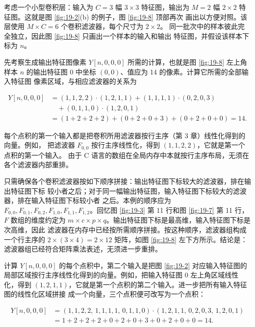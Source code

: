 考虑一个小型卷积层：输入为 $C=3$ 幅 $3\times3$ 特征图，输出为 $M=2$ 幅
$2\times2$ 特征图。这就是图 \ref{fig:19-2}(b) 的例子，图 \ref{fig:19-8} 顶部再次
画出以方便对照。该层使用 $M\times C=6$ 个卷积滤波器，每个尺寸为 $2\times2$。
同一批次中的样本彼此完全独立，因此图 \ref{fig:19-8} 只画出一个样本的输入和输出
特征图，并假设该样本下标为 $n$。

先考察生成输出特征图像素 $Y[n,0,0,0]$ 所需的计算，也就是图 \ref{fig:19-8} 左上角
样本 $n$ 的输出特征图 0 中坐标 $(0,0)$、值应为 14 的像素。计算它所需的全部输入特征图
像素区域，与相应滤波器的关系为

\begin{equation}
\begin{aligned}
Y[n,0,0,0]
 &= (1,1,2,2)\mathbin{\cdot}(1,2,1,1)
  +(1,1,1,1)\mathbin{\cdot}(0,2,0,3)\\
 &\quad +(0,1,1,0)\mathbin{\cdot}(1,2,0,1)\\
 &= (1+2+2+2)+(0+2+0+3)+(0+2+0+0)=14.
\end{aligned}
\label{eq:ch19-three-inner-products}
\end{equation}

每个点积的第一个输入都是把卷积所用滤波器按行主序（第 3 章）线性化得到的向量。例如，
把滤波器 $F_{0,0}$ 按行主序线性化，得到 $(1,1,2,2)$，它就是第一个点积的第一个输入。
由于 C 语言的数组在全局内存中本就按行主序布局，无须在各个滤波器内部重排。

只需确保各个卷积滤波器按如下顺序拼接：输出特征图下标较大的滤波器，排在输出特征图下标
较小者之后；对于同一幅输出特征图，输入特征图下标较大的滤波器，排在输入特征图下标较小者
之后。本例的顺序应为
$F_{0,0},F_{0,1},F_{0,2},F_{1,0},F_{1,1},F_{1,2}$。回忆图
\ref{fig:19-3} 第 11 行和图 \ref{fig:19-7} 第 11 行，$F$ 数组的维度约定为
$m\times c\times p\times q$。输出特征图下标是最高维，输入特征图下标是次高维，因此
滤波器在内存中已经按所需顺序拼接。按这种顺序，滤波器组构成一个行主序的
$2\times(3\times4)=2\times12$ 矩阵，如图 \ref{fig:19-8} 左下方所示。结论是：
滤波器组已经符合矩阵乘法表述，无须进一步重排。

计算 $Y[n,0,0,0]$ 的每个点积中，第二个输入是把图 \ref{fig:19-2} 对应输入特征图的
局部区域按行主序线性化得到的向量。例如，把输入特征图 0 左上角区域线性化，得到
$(1,2,1,1)$，它就是第一个点积的第二个输入。进一步把所有输入特征图的线性化区域拼接
成一个向量，三个点积便可改写为一个点积：

\begin{equation}
\begin{aligned}
Y[n,0,0,0]
 &= (1,1,2,2,\,1,1,1,1,\,0,1,1,0)\mathbin{\cdot}
    (1,2,1,1,\,0,2,0,3,\,1,2,0,1)\\
 &=1+2+2+2+0+2+0+3+0+2+0+0=14.
\end{aligned}
\label{eq:ch19-one-inner-product}
\end{equation}

